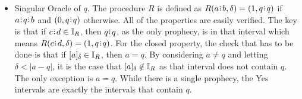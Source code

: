 \documentclass[12pt]{article}
\begin{document}
\begin{itemize}
    \item Singular Oracle of $q$. The procedure $R$ is defined as $R(a \rint b,\delta) = (1, q \rint q)$ if $a \rint q \rint b$ and $(0, q \rint q)$ otherwise. All of the properties are easily verified. The key is that if $c \rint d \in \mathbb{I}_R$, then $q \rint q$, as the only prophecy, is in that interval which means $R(c \rint d, \delta) = (1, q \rint q)$. For the closed property, the check that has to be done is that if $[a]_{\delta} \in \mathbb{I}_R$, then $a = q$. By considering $a \neq q$ and letting $\delta < |a-q|$, it is the case that $[a]_{\delta} \notin \mathbb{I}_R$ as that interval does not contain $q$. The only exception is $a = q$. While there is a single prophecy, the Yes intervals are exactly the intervals that contain $q$. 


\end{itemize}
\end{document}
